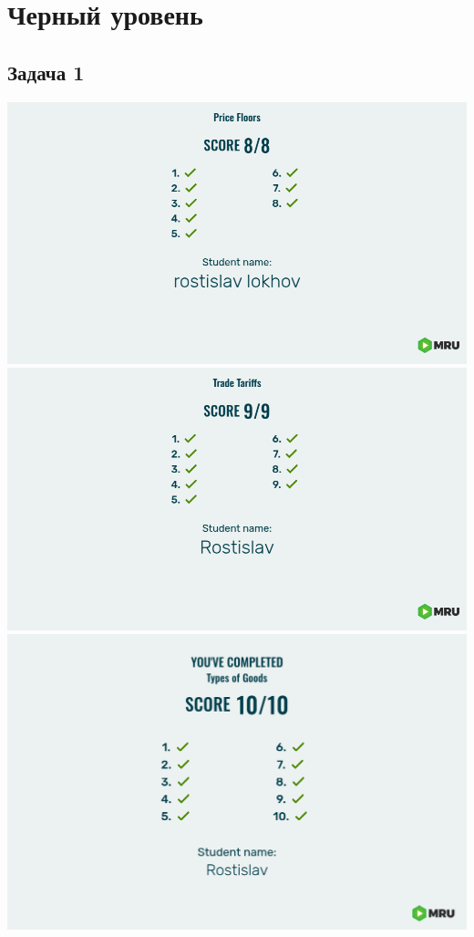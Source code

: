 \documentclass[a4paper,12pt]{article}
\begin{document}
\section{Черный уровень}
\subsection{Задача 1}
\includegraphics[scale=0.15]{graphs/3.2.jpg}
\includegraphics[scale=0.15]{graphs/3.3.jpg}
\includegraphics[scale=0.1]{graphs/3.4.jpg}
\end{document}
